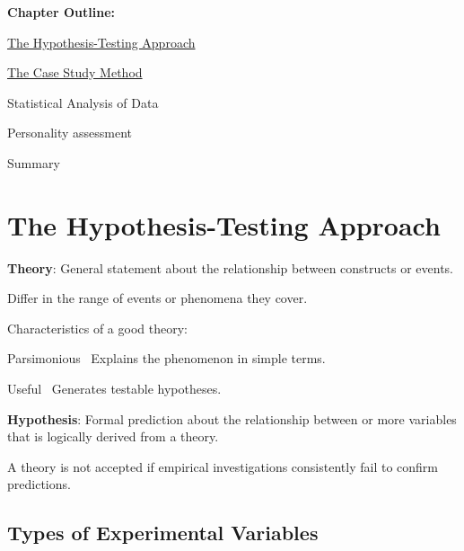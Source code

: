 \textbf{Chapter Outline:}
\begin{coloredlist}
    \item \hyperlink{hypothesis testing}{The Hypothesis-Testing Approach}
    \item \hyperlink{case study}{The Case Study Method}
    \item Statistical Analysis of Data
    \item Personality assessment
    \item Summary
\end{coloredlist}
\hypertarget{hypothesis testing}{}
\section{The Hypothesis-Testing Approach}   
\begin{coloredlist}
    \item \textbf{Theory}: General statement about the relationship between constructs or events.
    \begin{coloredlist}
        \item Differ in the range of events or phenomena they cover.
    \end{coloredlist}
    \item Characteristics of a good theory:
    \begin{coloredlist}
        \item Parsimonious \textendash\ Explains the phenomenon in simple terms.
        \item Useful \textendash\ Generates testable hypotheses.
    \end{coloredlist}
    \item \textbf{Hypothesis}: Formal prediction about the relationship between or more variables that is logically derived from a theory.
    \item A theory is not accepted if empirical investigations consistently fail to confirm predictions.
\end{coloredlist}

\subsection{Types of Experimental Variables}

